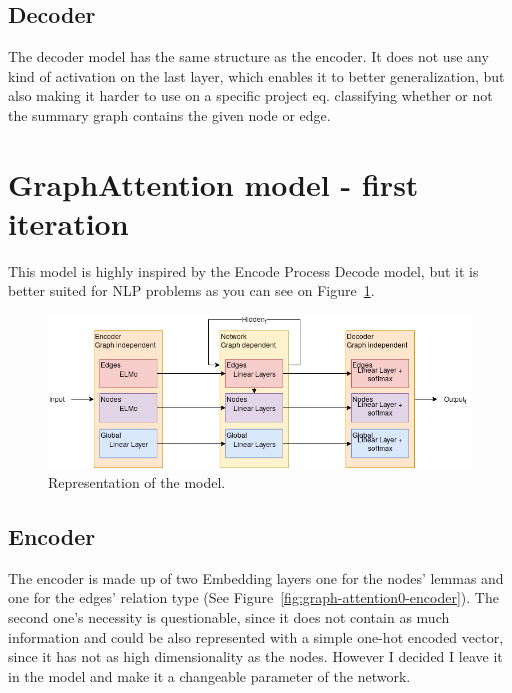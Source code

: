 \subsection{Decoder}
The decoder model has the same structure as the encoder. It does not use any kind of activation on the last layer, which enables it to better generalization, but also making it harder to use on a specific project eq. classifying whether or not the summary graph contains the given node or edge.

\section{GraphAttention model - first iteration}
This model is highly inspired by the Encode Process Decode model, but it is better suited for NLP problems as you can see on Figure~\ref{fig:graph-attention0}.

\begin{figure}[!ht]
	\centering
	\includegraphics[width=150mm, keepaspectratio]{figures/GA0.png}
	\caption{Representation of the model.}
	\label{fig:graph-attention0}
\end{figure}

\subsection{Encoder}

The encoder is made up of two Embedding layers one for the nodes' lemmas and one for the edges' relation type (See Figure~\ref{fig:graph-attention0-encoder}). The second one's necessity is questionable, since it does not contain as much information and could be also represented with a simple one-hot encoded vector, since it has not as high dimensionality as the nodes. However I decided I leave it in the model and make it a changeable parameter of the network.

